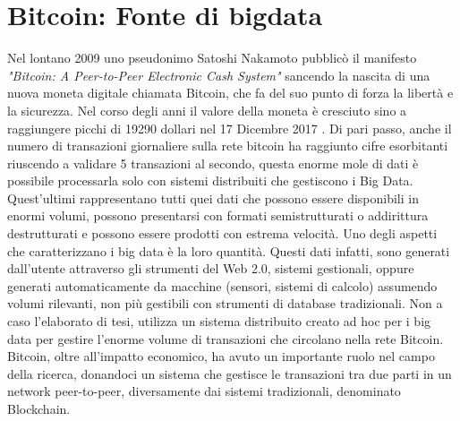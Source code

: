 \chapter{Bitcoin: Fonte di bigdata}
\label{chap:bitcoin fonte di bigdata}

Nel lontano 2009 uno pseudonimo Satoshi Nakamoto pubblicò il manifesto \textit{"Bitcoin: A Peer-to-Peer Electronic Cash System"}\cite{bitcoin:white-paper} sancendo la nascita di una nuova moneta digitale chiamata Bitcoin, che fa  del suo punto di forza la libertà e la sicurezza. Nel corso degli anni il valore della moneta è cresciuto sino a raggiungere picchi di 19290 dollari nel 17 Dicembre 2017 \cite{blockchain.com:valueOf}. Di pari passo, anche il numero di transazioni giornaliere sulla rete bitcoin ha raggiunto cifre esorbitanti riuscendo a validare 5 transazioni al secondo\cite{blockchain.com:transactions}, questa enorme mole di dati è possibile processarla solo con sistemi distribuiti che gestiscono i Big Data. Quest'ultimi rappresentano tutti quei dati che possono essere disponibili in enormi volumi, possono presentarsi con formati semistrutturati o addirittura destrutturati e possono essere prodotti con estrema velocità. Uno degli aspetti che caratterizzano i big data è la loro quantità. Questi dati infatti, sono generati dall'utente attraverso gli strumenti del Web 2.0, sistemi gestionali, oppure generati automaticamente da macchine (sensori, sistemi di calcolo) assumendo volumi rilevanti, non più gestibili con strumenti di database tradizionali. Non a caso l'elaborato di tesi, utilizza un sistema distribuito creato ad hoc per i big data per gestire l'enorme volume di transazioni che circolano nella rete Bitcoin.
\\Bitcoin, oltre all'impatto economico, ha avuto un importante ruolo nel campo della ricerca, donandoci un sistema che gestisce le transazioni tra due parti in un network peer-to-peer, diversamente dai sistemi tradizionali, denominato Blockchain.




